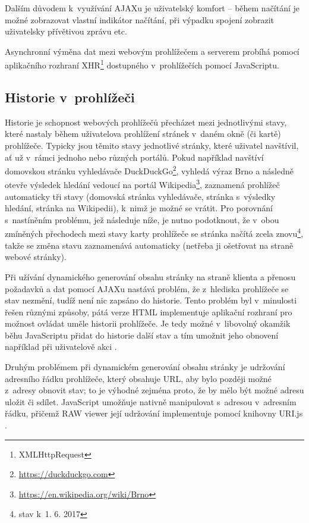 \documentclass[a4paper,11pt,openany,twoside]{book}
\newcommand{\simplywn}{RAW viewer }
\newcommand\ex{\textsf}
\begin{document}
					Dalším důvodem k~využívání AJAXu je uživatelský komfort -- během načítání je možné zobrazovat vlastní indikátor načítání, při výpadku spojení zobrazit uživatelsky přívětivou zprávu etc.

					Asynchronní výměna dat mezi webovým prohlížečem a serverem probíhá pomocí aplikačního rozhraní XHR\footnote{XMLHttpRequest} dostupného v~prohlížečích pomocí JavaScriptu. \parencite{mozilla2017XMLHTTP}

				\subsection{Historie v~prohlížeči}

					Historie je schopnost webových prohlížečů přecházet mezi jednotlivými stavy, které nastaly během uživatelova prohlížení stránek v~daném okně (či kartě) prohlížeče. Typicky jsou těmito stavy jednotlivé stránky, které uživatel navštívil, ať už v~rámci jednoho nebo různých portálů. Pokud například navštíví domovskou stránku vyhledávače DuckDuckGo\footnote{\url{https://duckduckgo.com}}, vyhledá výraz \ex{Brno} a následně otevře výsledek hledání vedoucí na portál Wikipedia\footnote{\url{https://en.wikipedia.org/wiki/Brno}}, zaznamená prohlížeč automaticky tři stavy (domovská stránka vyhledávače, stránka s~výsledky hledání, stránka na Wikipedii), k~nimž je možné se vrátit. Pro porovnání s~nastíněním problému, jež následuje níže, je nutno podotknout, že v~obou zmíněných přechodech mezi stavy karty prohlížeče se stránka načítá zcela znovu\footnote{stav k~1. 6. 2017}, takže se změna stavu zaznamenává automaticky (netřeba ji ošetřovat na straně webové stránky).

					Při užívání dynamického generování obsahu stránky na straně klienta a přenosu požadavků a dat pomocí AJAXu nastává problém, že z~hlediska prohlížeče se stav nezmění, tudíž není nic zapsáno do historie. Tento problém byl v~minulosti řešen různými způsoby, pátá verze HTML implementuje aplikační rozhraní pro možnost ovládat uměle historii prohlížeče. Je tedy možné v~libovolný okamžik běhu JavaScriptu přidat do historie další stav a tím umožnit jeho obnovení například při uživatelově akci .

					Druhým problémem při dynamickém generování obsahu stránky je udržování adresního řádku prohlížeče, který obsahuje URL, aby bylo později možné z~adresy obnovit stav; to je výhodné zejména proto, že by mělo být možné adresu uložit či sdílet. JavaScript umožňuje nativně manipulovat s~adresou v~adresním řádku, přičemž \simplywn její udržování implementuje pomocí knihovny URI.js \parencite{urijsWeb}.
\end{document}
